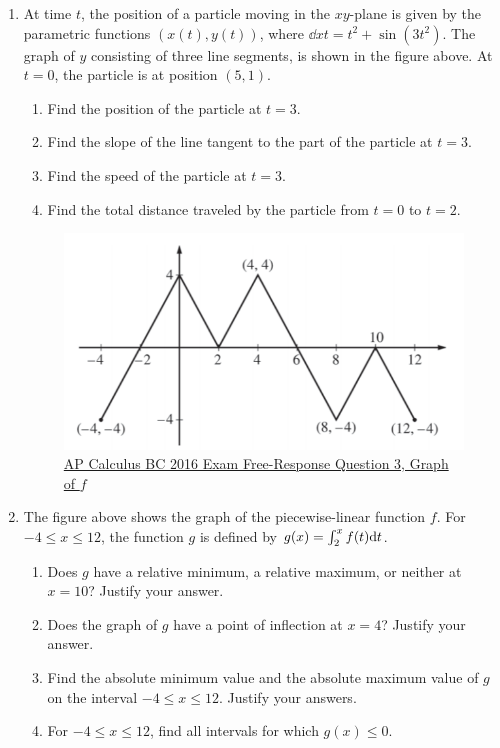 \begin{enumerate}
	\item At time $t$, the position of a particle moving in the $xy$-plane is given by the parametric functions $(x(t),y(t))$, where $\dd{x}{t} = t^2 + \sin{(3t^2)}$.
		The graph of $y$ consisting of three line segments, is shown in the figure above.
		At $t=0$, the particle is at position $(5,1)$.
		\begin{enumerate}
			\item Find the position of the particle at $t=3$.
			\item Find the slope of the line tangent to the part of the particle at $t=3$.
			\item Find the speed of the particle at $t=3$.
			\item Find the total distance traveled by the particle from $t=0$ to $t=2$.
		\end{enumerate}
	
	\begin{figure}[H]
		\label{2016_3}
		\centering
		\includegraphics{./additional_materials/2016_3.png}
		\caption{\hyperref{https://secure-media.collegeboard.org/digitalServices/pdf/ap/ap16\_frq\_calculus\_bc.pdf}{}{}{AP Calculus BC 2016 Exam Free-Response Question 3, Graph of $f$}}
	\end{figure}
	
	\item The figure above shows the graph of the piecewise-linear function $f$.
		For $-4 \leq x \leq 12$, the function $g$ is defined by $g(x)=\int_{2}^{x}{f(t)\mathrm{d} t}$.
		\begin{enumerate}
			\item Does $g$ have a relative minimum, a relative maximum, or neither at $x=10$?
				Justify your answer.
			\item Does the graph of $g$ have a point of inflection at $x=4$?
				Justify your answer.
			\item Find the absolute minimum value and the absolute maximum value of $g$ on the interval $-4 \leq x \leq 12$.
				Justify your answers.
			\item For $-4 \leq x \leq 12$, find all intervals for which $g(x) \leq 0$.
		\end{enumerate}
	

\end{enumerate}
